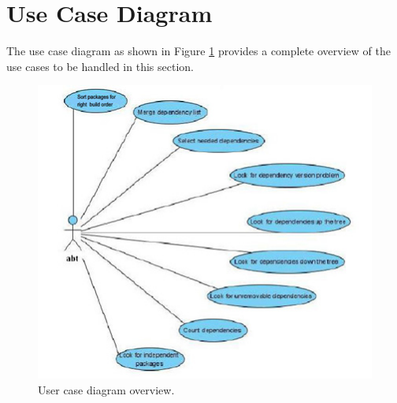 \section{Use Case Diagram}
The use case diagram as shown in Figure \ref{fig:diagram} provides a complete overview of the use cases to be handled in this section.

\begin{figure}
	\centering
	\includegraphics[bb=0 0 167 147]{ucd.jpg}
	\caption{User case diagram overview.}
	\label{fig:diagram}
\end{figure}

